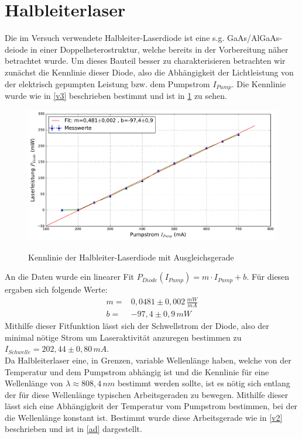 \documentclass[twoside,colorback,accentcolor=tud4c,11pt]{tudreport}
\begin{document}
\section{Halbleiterlaser}
Die im Versuch verwendete Halbleiter-Laserdiode ist eine s.g. GaAs/AlGaAs-deiode in einer Doppelheterostruktur, welche bereits in der Vorbereitung näher betrachtet wurde. Um dieses Bauteil besser zu charakterisieren betrachten wir zunächst die Kennlinie dieser Diode, also die Abhängigkeit der Lichtleistung von der elektrisch gepumpten Leistung bzw. dem Pumpstrom $I_{Pump}$. Die Kennlinie wurde wie in \ref{v3} beschrieben bestimmt und ist in \ref{kd} zu sehen.
\begin{figure}[H]
\centering
   	\begin{minipage}[b]{0.9\textwidth}
   	\includegraphics[width=\textwidth]{graphics/kennlinie_diode.pdf}
  	\label{kd}
   	\end{minipage}
\caption{Kennlinie der Halbleiter-Laserdiode mit Ausgleichsgerade}	
\end{figure}
An die Daten wurde ein linearer Fit $P_{Diode}(I_{Pump})=m\cdot I_{Pump} +b $. Für diesen ergaben sich folgende Werte:
\begin{align}
m=& 0,0481 \pm 0,002\,\si{\frac{mW}{mA}}\\
b=& -97,4 \pm 0,9\,\si{mW}
\end{align}
Mithilfe dieser Fitfunktion lässt sich der Schwellstrom der Diode, also der minimal nötige Strom um Laseraktivität anzuregen bestimmen zu $I_{Schwelle}=202,44\pm 0,80\,\si{mA}$.\\
Da Halbleiterlaser eine, in Grenzen, variable Wellenlänge haben, welche von der Temperatur und dem Pumpstrom abhängig ist und die Kennlinie für eine Wellenlänge von $\lambda\approx 808,4\,\si{nm}$ bestimmt werden sollte, ist es nötig sich entlang der für diese Wellenlänge typischen Arbeitsgeraden zu bewegen. Mithilfe dieser lässt sich eine Abhängigkeit der Temperatur vom Pumpstrom bestimmen, bei der die Wellenlänge konstant ist. Bestimmt wurde diese Arbeitsgerade wie in \ref{v2} beschrieben und ist in \ref{ad} dargestellt.
\end{document}

